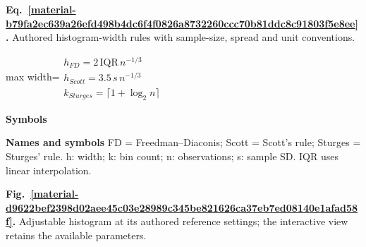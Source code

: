 \documentclass[11pt,a4paper]{article}
\begin{document}
\par\medskip
\noindent\begin{minipage}{\linewidth}
\label{material-b79fa2ec639a26efd498b4dc6f4f0826a8732260ccc70b81ddc8c91803f5e8ee}
\noindent\textbf{Eq.~\ref*{material-b79fa2ec639a26efd498b4dc6f4f0826a8732260ccc70b81ddc8c91803f5e8ee}.} Authored histogram-width rules with sample-size, spread and unit conventions.\par\nopagebreak
\begin{center}\begin{adjustbox}{max width=\linewidth}$\displaystyle \begin{gathered}h_{FD}=2\,\mathrm{IQR}\,n^{-1/3}\\h_{Scott}=3.5\,s\,n^{-1/3}\\k_{Sturges}=\lceil1+\log_2 n\rceil\end{gathered}$\end{adjustbox}\end{center}

\par\noindent\textbf{Symbols}

\par\noindent\textbf{Names and symbols} FD = Freedman–Diaconis; Scott = Scott's rule; Sturges = Sturges' rule. h: width; k: bin count; n: observations; s: sample SD. IQR uses linear interpolation.

\end{minipage}\par
\medskip

\par\medskip
\Needspace{10cm}
\label{material-d9622bef2398d02aee45c03e28989c345be821626ca37eb7ed08140e1afad58f}
\noindent\textbf{Fig.~\ref*{material-d9622bef2398d02aee45c03e28989c345be821626ca37eb7ed08140e1afad58f}.} Adjustable histogram at its authored reference settings; the interactive view retains the available parameters.\par\nopagebreak
\begin{center}
\end{center}
\end{document}
